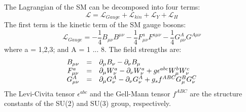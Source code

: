 \documentclass[thesis.tex]{subfiles}
\begin{document}
The Lagrangian of the SM can be decomposed into four terms: 
	\begin{equation}
		\mathcal{L} =  \mathcal{L}_{Gauge} + \mathcal{L}_{kin} + \mathcal{L}_{Y} + \mathcal{L}_{H}
	\end{equation}
The first term is the kinetic term of the SM gauge bosons:
	\begin{equation} 
		\mathcal{L}_{Gauge} = -\frac{1}{4}B_{\mu\nu} B^{\mu\nu} - \frac{1}{4}F_{\mu\nu}^a F^{a \mu\nu} - \frac{1}{4} G_{\mu\nu}^A G^{A \mu\nu}
	\end{equation}
where a = 1,2,3; and A = 1 ... 8. The field strengths are:
	\begin{equation}
		\begin{array}{c c l}
			B_{\mu\nu} & = & \partial_\mu B_\nu - \partial_\nu B_\mu \\
			F_{\mu\nu}^a &=&  \partial_\mu W_\nu^a - \partial_\nu W_\nu^a + g \epsilon^{abc}W_\mu^b W_\nu^c \\
			G_{\mu\nu}^A &=& \partial_\mu G_\nu^A - \partial_\nu G_\nu^A + g_s f^{ABC}G_{\mu}^B G_{\nu}^C 
		\end{array}
	\end{equation}
The Levi-Civita tensor $\epsilon^{abc}$ and the Gell-Mann tensor $f^{ABC}$ are the structure constants of the SU(2) and SU(3) group, respectively. 

			
	
\end{document}

